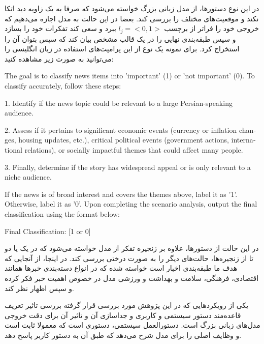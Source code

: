 در این نوع دستورها، از مدل زبانی بزرگ خواسته می‌شود که صرفا به یک زاویه دید اتکا نکند و موقعیت‌های مختلف را بررسی کند. بعضا در این حالت به مدل اجازه می‌دهیم که خروجی خود را فراتر از برچسب
$l_j = <0,1>$
ببرد و سعی کند تفکرات خود را بسازد و سپس طبقه‌بندی نهایی را در یک قالب مشخص بیان کند که سپس بتوان آن را استخراج کرد. برای نمونه یک نوع از این پرامپت‌های استفاده در زبان انگلیسی را می‌توانید به صورت زیر مشاهده کنید:
\pagebreak

\vspace{5pt}
\begin{scriptsize}
\begin{itshape}
\begin{latin}
\LTR
The goal is to classify news items into 'important' (1) or 'not important' (0). To classify accurately, follow these steps:

1. Identify if the news topic could be relevant to a large Persian-speaking audience.

2. Assess if it pertains to significant economic events (currency or inflation changes, housing updates, etc.), critical political events (government actions, international relations), or socially impactful themes that could affect many people.

3. Finally, determine if the story has widespread appeal or is only relevant to a niche audience.

If the news is of broad interest and covers the themes above, label it as '1'. Otherwise, label it as '0'. Upon completing the scenario analysis, output the final classification using the format below:

Final Classification: [1 or 0]
\RTL
\end{latin}
\end{itshape}
\end{scriptsize}
\vspace{5pt}

در این حالت از دستورها، علاوه بر زنجیره تفکر از مدل خواسته می‌شود که در یک یا دو تا از زنجیره‌ها، حالت‌های دیگر را به صورت درختی بررسی کند. در اینجا، از آنجایی که هدف ما طبقه‌بندی اخبار است خواسته شده که در انواع دسته‌بندی خبرها همانند اقتصادی، فرهنگی، سلامت و بهداشت و ورزشی مدل در خصوص اهمیت خبر فکر کرده و سپس اظهار نظر کند.

یکی از رویکردهایی که در این پژوهش مورد بررسی قرار گرفته بررسی تاثیر تعریف قاعده‌مند دستور سیستمی و کاربری و جداسازی آن و تاثیر آن برای دقت خروجی مدل‌های زبانی بزرگ است. دستورالعمل سیستمی، دستوری است که معمولا ثابت است و وظایف اصلی را برای مدل شرح می‌دهد که طبق آن به دستور کاربر پاسخ دهد.

